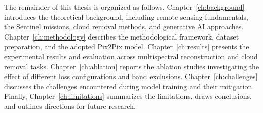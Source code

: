 The remainder of this thesis is organized as follows.
Chapter~\ref{ch:background} introduces the theoretical background, including remote sensing fundamentals, the Sentinel missions, cloud removal methods, and generative AI approaches.
Chapter~\ref{ch:methodology} describes the methodological framework, dataset preparation, and the adopted Pix2Pix model.
Chapter~\ref{ch:results} presents the experimental results and evaluation across multispectral reconstruction and cloud removal tasks.
Chapter~\ref{ch:ablation} reports the ablation studies investigating the effect of different loss configurations and band exclusions.
Chapter~\ref{ch:challenges} discusses the challenges encountered during model training and their mitigation.
Finally, Chapter~\ref{ch:limitations} summarizes the limitations, draws conclusions, and outlines directions for future research.